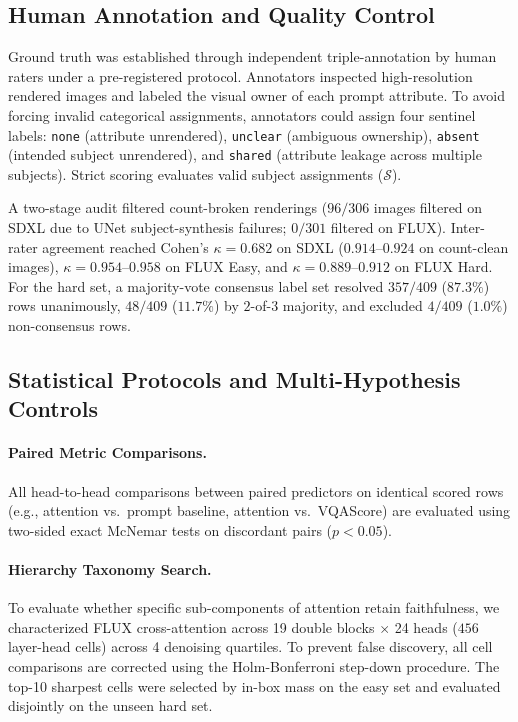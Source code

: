 \subsection{Human Annotation and Quality Control}
\label{sec:setup_annotation}
Ground truth was established through independent triple-annotation by human raters under a pre-registered protocol. Annotators inspected high-resolution rendered images and labeled the visual owner of each prompt attribute. To avoid forcing invalid categorical assignments, annotators could assign four sentinel labels: \texttt{none} (attribute unrendered), \texttt{unclear} (ambiguous ownership), \texttt{absent} (intended subject unrendered), and \texttt{shared} (attribute leakage across multiple subjects). Strict scoring evaluates valid subject assignments ($\mathcal{S}$).

A two-stage audit filtered count-broken renderings ($96/306$ images filtered on SDXL due to UNet subject-synthesis failures; $0/301$ filtered on FLUX). Inter-rater agreement reached Cohen's $\kappa = 0.682$ on SDXL ($0.914$--$0.924$ on count-clean images), $\kappa = 0.954$--$0.958$ on FLUX Easy, and $\kappa = 0.889$--$0.912$ on FLUX Hard. For the hard set, a majority-vote consensus label set resolved $357/409$ ($87.3\%$) rows unanimously, $48/409$ ($11.7\%$) by $2$-of-$3$ majority, and excluded $4/409$ ($1.0\%$) non-consensus rows.

\subsection{Statistical Protocols and Multi-Hypothesis Controls}
\label{sec:setup_stats}
\paragraph{Paired Metric Comparisons.} All head-to-head comparisons between paired predictors on identical scored rows (e.g., attention vs.\ prompt baseline, attention vs.\ VQAScore) are evaluated using two-sided exact McNemar tests on discordant pairs ($p < 0.05$).

\paragraph{Hierarchy Taxonomy Search.} To evaluate whether specific sub-components of attention retain faithfulness, we characterized FLUX cross-attention across 19 double blocks $\times$ 24 heads ($456$ layer-head cells) across 4 denoising quartiles. To prevent false discovery, all cell comparisons are corrected using the Holm-Bonferroni step-down procedure. The top-10 sharpest cells were selected by in-box mass on the easy set and evaluated disjointly on the unseen hard set.

